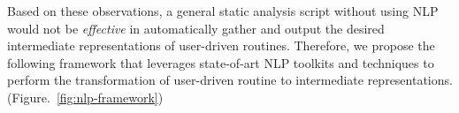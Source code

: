 Based on these observations, a general static analysis script without using NLP would not be \textit{effective} in automatically gather and output the desired intermediate representations of user-driven routines. Therefore, we propose the following framework that leverages state-of-art NLP toolkits and techniques to perform the transformation of user-driven routine to intermediate representations. (Figure.~\ref{fig:nlp-framework})

